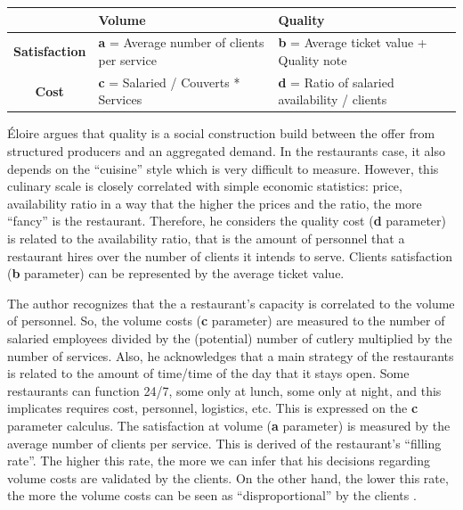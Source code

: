 \documentclass[a4paper, 12pt, openright, oneside, german, french, brazil, english]{abntex2}
\begin{document}
        \begin{table}[ht]
         {\begin{tabular}{c | p{5cm} p{5cm}}
         		\hline
            & \textbf{Volume}  & \textbf{Quality} \\
            \hline
            \textbf{Satisfaction}  & \textbf{a} = Average number of clients per service & \textbf{b} = Average ticket value + Quality note \\
            \textbf{Cost} & \textbf{c} = Salaried / Couverts * Services & \textbf{d} = Ratio of salaried availability / clients \\
            \hline
          \end{tabular}
      	}
  		{}
        \end{table}

	Éloire argues that quality is a social construction build between the offer from structured producers and an aggregated demand. In the restaurants case, it also depends on the ``cuisine'' style which is very difficult to measure. However, this culinary scale is closely correlated with simple economic statistics: price, availability ratio in a way that the higher the prices and the ratio, the more ``fancy'' is the restaurant. Therefore, he considers the quality cost (\textbf{d} parameter) is related to the availability ratio, that is the amount of personnel that a restaurant hires over the number of clients it intends to serve. Clients satisfaction (\textbf{b} parameter) can be represented by the average ticket value.

        The author recognizes that the a restaurant's capacity is correlated to the volume of personnel. So, the volume costs (\textbf{c} parameter) are measured to the number of salaried employees divided by the (potential) number of cutlery multiplied by the number of services. Also, he acknowledges that a main strategy of the restaurants is related to the amount of time/time of the day that it stays open. Some restaurants can function 24/7, some only at lunch, some only at night,  and this implicates requires cost, personnel, logistics, etc. This is expressed on the \textbf{c} parameter calculus. The satisfaction at volume (\textbf{a} parameter) is measured by the average number of clients per service. This is derived of the restaurant's ``filling rate''. The higher this rate, the more we can infer that his decisions regarding volume costs are validated by the clients. On the other hand, the lower this rate, the more the volume costs can be seen as ``disproportional'' by the clients \cite{eloire2009reseaux}.
\end{document}
